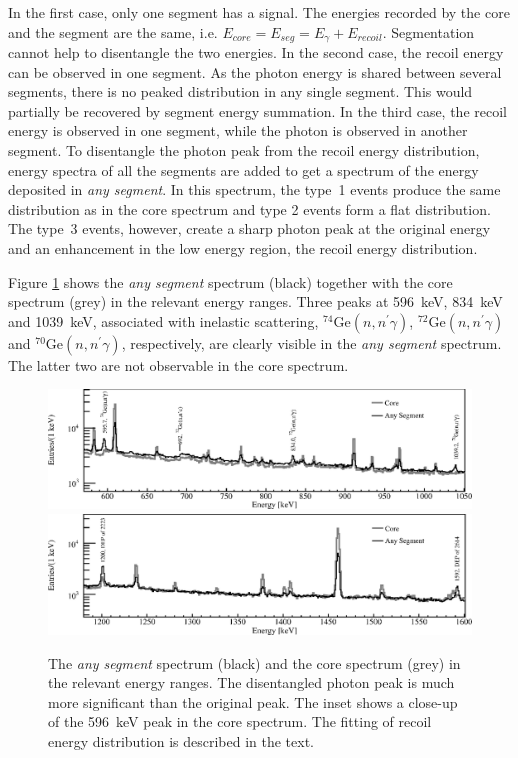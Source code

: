 In the first case, only one segment has a signal. The energies
recorded by the core and the segment are the same, i.e. $E_{core} =
E_{seg} = E_{\gamma} + E_{recoil}$. Segmentation cannot help to
disentangle the two energies. In the second case, the recoil energy
can be observed in one segment. As the photon energy is shared between
several segments, there is no peaked distribution in any single
segment. This would partially be recovered by segment energy
summation. In the third case, the recoil energy is observed in one
segment, while the photon is observed in another segment. To
disentangle the photon peak from the recoil energy distribution,
energy spectra of all the segments are added to get a spectrum of the
energy deposited in \emph{any segment}. In this spectrum, the type~1
events produce the same distribution as in the core spectrum and type
2 events form a flat distribution. The type~3 events, however, create
a sharp photon peak at the original energy and an enhancement in the
low energy region, the recoil energy distribution.

Figure \ref{fig:neu:cas} shows the \emph{any segment} spectrum (black) together with the core spectrum (grey) in the relevant energy ranges. Three peaks at 596~keV, 834~keV and 1039~keV, associated with inelastic scattering, $^{74}$Ge$(n, n^\prime\gamma)$, $^{72}$Ge$(n, n^\prime\gamma)$ and $^{70}$Ge$(n, n^\prime\gamma)$, respectively, are clearly visible in the \emph{any segment} spectrum. The latter two are not observable in the core spectrum.

\begin{figure}[tbhp]
  \centering
  \includegraphics[width=\textwidth,clip]{spe_casp}
  \includegraphics[width=\textwidth,clip]{spe_cas2p}
  \caption{The \emph{any segment} spectrum (black) and the core     spectrum (grey) in the relevant energy ranges. The disentangled     photon peak is much more significant than the original peak. The     inset shows a close-up of the 596~keV peak in the core spectrum.     The fitting of recoil energy distribution is described in the     text.}
  \label{fig:neu:cas}
\end{figure}

